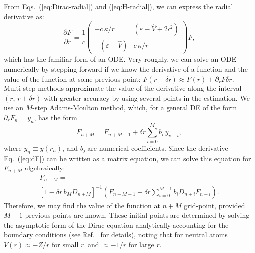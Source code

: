 \documentclass[10pt,twocolumn,a4paper]{article}%
\newcommand{\matr}[4]{\ensuremath{\begin{pmatrix}#1&#2\\#3&#4\end{pmatrix}}}	%
\newcommand{\be}{\begin{equation}}
\newcommand{\ee}{\end{equation}}
\def\en{\ensuremath{\varepsilon}}
\def\p{\ensuremath{\partial}}
\renewcommand{\k}{\ensuremath{\kappa}}
\begin{document}
From Eqs.~(\ref{eq:Dirac-radial}) and (\ref{eq:H-radial}), we can express the radial derivative as:
\be\label{eq:dF}
\frac{\p F}{\p r}
=\frac{1}{c} \matr 	{-c\,{\k}/{r}} 	{(\en - \hat V+2c^2)}  {-(\en - \hat V)} 	 {c\,{\k}/{r}}F,
\ee
which has the familiar form of an ODE.
Very roughly, we can solve an ODE numerically by stepping forward if we know the derivative of a function and the value of the function at some previous point: $F(r+\delta r) \approx F(r) + {\p_r F}\delta r$.
Multi-step methods approximate the value of the derivative along the interval $(r, \, r+\delta r)$ with greater accuracy by using several points in the estimation.
We use an $M$-step Adams-Moulton method,
which, for a general DE of the form $\p_r F_n  = y_n$, has the form
\be\label{eq:Adams}
F_{n+M} = F_{n+M-1} + \delta r \sum_{i=0}^M b_i \, y_{n+i},
\ee
where $y_n\equiv y(r_n)$, and $b_j$ are numerical coefficients. %
Since the derivative Eq.~(\ref{eq:dF}) can be written as a matrix equation, we can solve this equation for $F_{n+M}$ algebraically:
\begin{multline}
F_{n+M} = \\\left[1 - \delta r\,b_M D_{n+M}\right]^{-1}\left(F_{n+M-1} + \delta r \sum_{i=0}^{M-1} b_i D_{n+i}F_{n+i}\right).
\end{multline}
Therefore, we may find the value of the function at ${n+M}$ grid-point, provided $M-1$ previous points are known.
These initial points are determined by solving the asymptotic form of the Dirac equation analytically accounting for the boundary conditions (see Ref.~\cite{JohnsonBook2007} for details), noting that for neutral atoms $V(r)\approx-Z/r$ for small $r$, and
$\approx-1/r$ for large $r$. %
\end{document}
